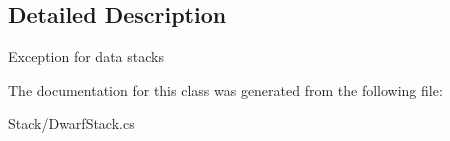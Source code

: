 \subsection{Detailed Description}
Exception for data stacks 



The documentation for this class was generated from the following file\+:\begin{DoxyCompactItemize}
\item 
Stack/Dwarf\+Stack.\+cs\end{DoxyCompactItemize}
